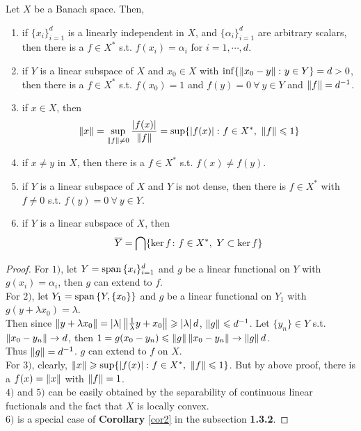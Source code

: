 \documentclass[a4paper,11pt]{report}
\begin{document}
\begin{cor}
	Let $X$ be a Banach space. Then, 
	\begin{enumerate}[label=\arabic*)]
		\item if $\{x_i\}_{i=1}^{d}$ is a linearly independent in $X$, and $\{\alpha_i\}_{i=1}^{d}$ are arbitrary scalars, then there is a $f \in X^{*}$ s.t. $f(x_i) = \alpha_i$ for $i=1,\cdots,d$.
		\item if $Y$ is a linear subspace of $X$ and $x_0 \in X$ with $\operatorname{inf}\{\left\lVert x_0-y\right\lVert \colon y \in Y \} = d > 0$, then there is a $f \in X^{*}$ s.t. $f(x_0) = 1$ and $f(y) = 0 ~\forall~ y \in Y$ and $\left\lVert f\right\lVert=d^{-1}$.
		\item if $x \in X$, then
			\begin{equation*}
				\left\lVert x\right\lVert = \sup_{\left\lVert f\right\lVert \neq 0} \frac{\left\lvert f(x)\right\lvert}{\left\lVert f\right\lVert} = \sup \{\left\lvert f(x)\right\lvert \colon f \in X^{*},~ \left\lVert f\right\lVert \leqslant 1 \}
			\end{equation*}
		\item if $x \neq y$ in $X$, then there is a $f \in X^{*}$ s.t. $f(x) \neq f(y)$.
		\item if $Y$ is a linear subspace of $X$ and $Y$ is not dense, then there is $f \in X^{*}$ with $f \neq 0$ s.t. $f(y) = 0 ~\forall~ y \in Y$.
		\item if $Y$ is a linear subspace of $X$, then
			\begin{equation*}
				\overline{Y} = \bigcap\{\ker{f} \colon f \in X^{*},~ Y \subset \ker{f}\}
			\end{equation*}
	\end{enumerate}
\end{cor}
\begin{proof}
	For $1)$, let $Y= \operatorname{span}{\{x_i\}_{i=1}^{d}}$ and $g$ be a linear functional on $Y$ with $g(x_i) = \alpha_i$, then $g$ can extend to $f$.\\
	For $2)$, let $Y_1 = \operatorname{span}{\{Y,\{x_0\}\}}$ and $g$ be a linear functional on $Y_1$ with $g(y+\lambda x_0) = \lambda$. \\Then since $\left\lVert y+\lambda x_0\right\lVert = \left\lvert\lambda\right\lvert\left\lVert\frac{1}{\lambda}y+x_0\right\lVert \geqslant \left\lvert\lambda\right\lvert d$, $\left\lVert g\right\lVert \leqslant d^{-1}$. Let $\{y_n\} \in Y$ s.t.\\ $\left\lVert x_0-y_n\right\lVert \rightarrow d$, then $1 = g(x_0 - y_n) \leqslant \left\lVert g\right\lVert \left\lVert x_0-y_n\right\lVert \rightarrow \left\lVert g\right\lVert d$. \\Thus $\left\lVert g\right\lVert = d^{-1}$. $g$ can extend to $f$ on $X$.\\
	For $3)$, clearly, $\left\lVert x\right\lVert \geqslant \sup \{\left\lvert f(x)\right\lvert \colon f \in X^{*},~ \left\lVert f\right\lVert \leqslant 1 \}$. But by above proof, there is a $f(x) = \left\lVert x\right\lVert$ with $\left\lVert f\right\lVert = 1$.\\
	$4)$ and $5)$ can be easily obtained by the separability of continuous linear fuctionals and the fact that $X$ is locally convex.\\
	$6)$ is a special case of \textbf{Corollary} \ref{cor2} in the subsection \textbf{1.3.2}.
\end{proof}
\end{document}
